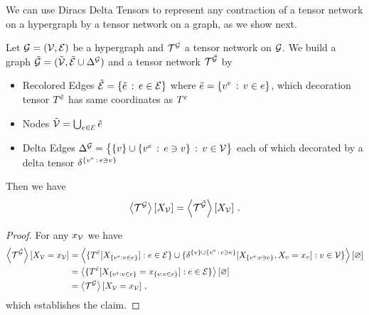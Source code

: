 We can use Diracs Delta Tensors to represent any contraction of a tensor network on a hypergraph by a tensor network on a graph, as we show next.

\begin{lemma}
    \label{lem:deltification}
    Let $\mathcal{G}=(\mathcal{V},\mathcal{E})$ be a hypergraph and $\mathcal{T}^{\mathcal{G}}$ a tensor network on $\mathcal{G}$.
    We build a graph $\tilde{\mathcal{G}}=(\tilde{\mathcal{V}},\tilde{\mathcal{E}}\cup\Delta^{\mathcal{G}})$ and a tensor network $\mathcal{T}^{\tilde{\mathcal{G}}}$ by %
    \begin{itemize}
        \item Recolored Edges $\tilde{\mathcal{E}} = \{\tilde{e} \, : \, e\in \mathcal{E}\}$ where $\tilde{e} = \{v^{e} \, : \, v\in e\}$, which decoration tensor $T^{\tilde{e}}$ has same coordinates as $T^{e}$
        \item Nodes $\tilde{\mathcal{V}} = \bigcup_{e\in\mathcal{E}}\tilde{e}$ %
        \item Delta Edges $\Delta^{\mathcal{G}} =  \big\{ \{v\} \cup \{v^{e} \, : \, e\ni v \} \, : \, v\in\mathcal{V} \big\} $ each of which decorated by a delta tensor $\delta^{\{v^{e} \, : \, e\ni v \}}$
    \end{itemize}
    Then we have
    \begin{align*}
        \left\langle \mathcal{T}^{\mathcal{G}}\right\rangle \left[ X_{\mathcal{V}} \right] =  \left\langle \mathcal{T}^{\tilde{\mathcal{G}}}\right\rangle \left[ X_{\mathcal{V}} \right]  \, .
    \end{align*}
\end{lemma}
\begin{proof}
    For any $x_{\mathcal{V}}$ we have
    \begin{align*}
        \left\langle \mathcal{T}^{\tilde{\mathcal{G}}}\right\rangle \left[ X_{\mathcal{V}}=x_{\mathcal{V}} \right]
        & = \left\langle \{T^{\tilde{e}}[X_{\{v^{e} : v\in e\}}] : e \in \mathcal{E} \}\cup
        \{\delta^{\{v\} \cup \{v^{e} \, : \, e\ni v \}}[X_{\{v^{e} : e\ni v \}}, X_{v}=x_{v} ]  : v\in\mathcal{V} \}
        \right\rangle \left[ \varnothing \right] \\
        & =  \left\langle \{T^{\tilde{e}}[X_{\{v^{e} : v\in e\}} = x_{\{v : v\in e\}} ] : e \in \mathcal{E} \}
        \right\rangle \left[ \varnothing \right] \\
        & = \left\langle \mathcal{T}^{\mathcal{G}}\right\rangle \left[ X_{\mathcal{V}}=x_{\mathcal{V}} \right] \, ,
    \end{align*}
    which establishes the claim.
\end{proof}

